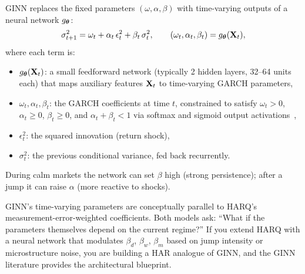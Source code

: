 GINN replaces the fixed parameters $(\omega, \alpha, \beta)$ with
time-varying outputs of a neural network $g_{\bm{\theta}}$:
\begin{equation}\label{eq:ginn}
  \sigma^2_{t+1} = \omega_t + \alpha_t\,\epsilon_t^2
    + \beta_t\,\sigma^2_t,
  \qquad
  (\omega_t, \alpha_t, \beta_t) = g_{\bm{\theta}}(\mathbf{X}_t),
\end{equation}
where each term is:
\begin{itemize}
  \item $g_{\bm{\theta}}(\mathbf{X}_t)$: a small feedforward network (typically 2
        hidden layers, 32--64 units each) that maps auxiliary features
        $\mathbf{X}_t$ to time-varying GARCH parameters,
  \item $\omega_t, \alpha_t, \beta_t$: the GARCH coefficients at time
        $t$, constrained to satisfy $\omega_t > 0$, $\alpha_t \geq 0$,
        $\beta_t \geq 0$, and $\alpha_t + \beta_t < 1$ via softmax and
        sigmoid output activations~\citep{GINN2024},
  \item $\epsilon_t^2$: the squared innovation (return shock),
  \item $\sigma^2_t$: the previous conditional variance, fed back
        recurrently.
\end{itemize}

\begin{intuition}
During calm markets the network can set $\beta$ high (strong
persistence); after a jump it can raise $\alpha$ (more reactive to
shocks).
\end{intuition}

\begin{projectconnection}
GINN's time-varying parameters are conceptually parallel to HARQ's
measurement-error-weighted coefficients.  Both models ask: ``What if
the parameters themselves depend on the current regime?''  If you
extend HARQ with a neural network that modulates $\beta_d$, $\beta_w$,
$\beta_m$ based on jump intensity or microstructure noise, you are
building a HAR analogue of GINN, and the GINN literature provides the
architectural blueprint.
\end{projectconnection}

